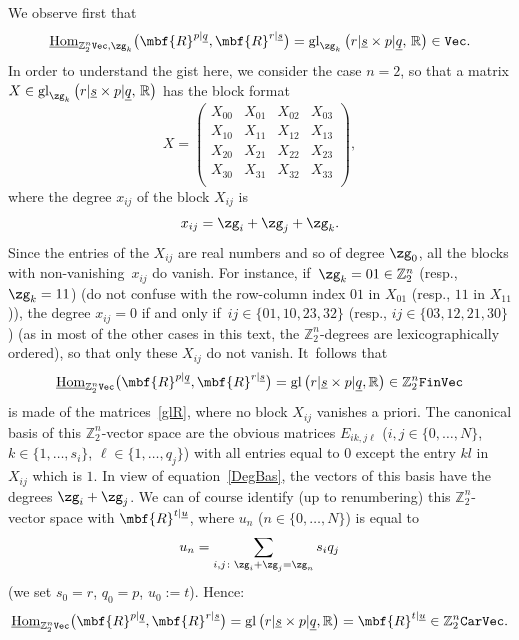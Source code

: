 \documentclass[pdftex]{sigma}%
\newcommand{\op}[1]{\operatorname{#1}}
\DeclareMathOperator{\Hom}{Hom}
\newcommand{\R}{{\mathbb R}}
\newcommand{\Z}{{\mathbb Z}}
\def\ul{\underline}
\def\ul{\underline}
\newcommand{\0}{\otimes}
\newcommand{\z}{\Z_2^n}
\numberwithin{equation}{section}
\begin{document}
We observe first that
\[
\ul{\Hom}_{\z{\tt Vec},\zg_k}\big(\mbf{R}^{p|\ul q},\mbf{R}^{r|\ul s}\big)=\op{gl}_{\zg_k}\big(r|\ul s \times p|\ul q,\,\R\big)\in{\tt Vec}.
\]
In order to understand the gist here, we consider the case $n=2$, so that a matrix $X\in\op{gl}_{\zg_k}\big(r|\ul s \times p|\ul q,\,\R\big)$ has the block format
\begin{equation}\label{glR}
X = \left(\begin{array}{c|c|c|c}
X_{00} & X_{01} & X_{02} & X_{03} \\
\hline
X_{10} & X_{11} & X_{12} & X_{13} \\
\hline
X_{20} & X_{21} & X_{22} & X_{23} \\
\hline
X_{30} & X_{31} & X_{32} & X_{33} \\
\end{array}\right)\!,
\end{equation}
where the degree $x_{ij}$ of the block $X_{ij}$ is
\begin{gather}\label{DegBas}
x_{ij}=\zg_i+\zg_j+\zg_k.
\end{gather}
Since the entries of the $X_{ij}$ are real numbers and so of degree $\zg_0$, all the blocks with non-vani\-shing~$x_{ij}$ do vanish. For instance, if~$\zg_k=01\in\z$ (resp., $\zg_k=11$) (do not confuse with the row-column index $01$ in $X_{01}$ (resp., $11$ in $X_{11}$)), the degree $x_{ij}=0$ if and only if~$ij\in\{01, 10, 23, 32\}$ (resp., $ij\in\{03, 12, 21, 30\}$) (as in most of the other cases in this text, the $\z$-degrees are lexicographically ordered), so that only these $X_{ij}$ do not vanish. It~follows that
\[
\ul{\Hom}_{\z\tt Vec}\big(\mbf{R}^{p|\ul q},\mbf{R}^{r|\ul s}\big)=\op{gl}\big(r|\ul s \times p|\ul q,\R\big)\in\z{\tt FinVec}
\]
is made of the matrices~\eqref{glR}, where no block $X_{ij}$ vanishes a priori. The canonical basis of this $\z$-vector space are the obvious matrices $E_{ik,j\ell}$ ($i,j\in\{0,\dots,N\}$, $k\in\{1,\dots,s_i\}$, $\ell\in\{1,\dots, q_j\}$) with all entries equal to 0 except the entry $kl$ in $X_{ij}$ which is $1$. In view of equation~\eqref{DegBas}, the vectors of this basis have the degrees $\zg_i+\zg_j$. We can of course identify (up to renumbering) this $\z$-vector space with $\mbf{R}^{t|\ul u}$, where $u_n$ ($n\in\{0,\dots,N\}$) is equal to
\begin{gather}\label{UN}
u_n=\sum_{i,j\colon \zg_i+\zg_j=\zg_n}s_iq_j
\end{gather}
(we set $s_0=r$, $q_0=p$, $u_0:=t$). Hence:
\begin{gather}\label{IHomVecMat}
\ul{\Hom}_{\z\tt Vec}\big(\mbf{R}^{p|\ul q},\mbf{R}^{r|\ul s}\big)=\op{gl}\big(r|\ul s \times p|\ul q,\R\big)=\mbf{R}^{t|\ul u}\in\z{\tt CarVec}.
\end{gather}
\end{document}
